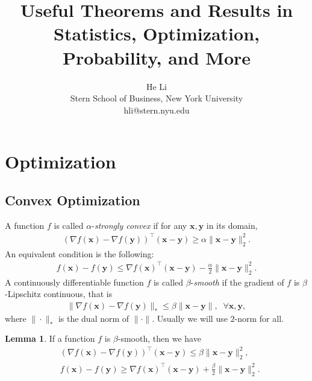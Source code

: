 \documentclass[twoside,11pt]{article}
\newcommand{\x}{\boldsymbol{x}}
\newcommand{\y}{\boldsymbol{y}}
\newcommand{\0}{\boldsymbol{0}}
\theoremstyle{definition}
\newtheorem{lemma}[theorem]{Lemma}
\begin{document}
\title{Useful Theorems and Results in Statistics, Optimization, Probability, and More}

\author{\name He Li \\
       \addr Stern School of Business, New York University \\
       hli@stern.nyu.edu
}

\maketitle

\section{Optimization}

\subsection{Convex Optimization}

A function $f$ is called $\alpha$-\emph{strongly convex} if for any $\x, \y$ in its domain,
\begin{align}
\label{eq:convex-1}
\left(\nabla f(\x) - \nabla f(\y) \right)^\top (\x - \y) \geq \alpha \| \x - \y \|_2^2.
\end{align}
An equivalent condition is the following:
\begin{align}
\label{eq:convex-2}
f(\x) - f(\y) \leq \nabla f(\x)^\top (\x - \y) - \frac{\alpha}{2} \| \x - \y \|_2^2.
\end{align}
A continuously differentiable function $f$ is called $\beta$-\emph{smooth} if the gradient of $f$ is $\beta$-Lipschitz continuous, that is
\begin{align}
\label{eq:smooth-1}
\| \nabla f(\x) - \nabla f(\y) \|_* \leq \beta \| \x - \y \|, \; \; \forall \x, \y,
\end{align}
where $\| \cdot \|_*$ is the dual norm of $\| \cdot \|$. Usually we will use $2$-norm for all.

\begin{lemma} If a function $f$ is $\beta$-smooth, then we have
\begin{align}
\label{eq:smooth-2}
&\left(\nabla f(\x) - \nabla f(\y) \right)^\top (\x - \y) \leq \beta \| \x - \y \|_2^2, \\
\label{eq:smooth-3}
&f(\x) - f(\y) \geq \nabla f(\x)^\top (\x - \y) + \frac{\beta}{2} \| \x - \y \|_2^2.
\end{align}
\end{lemma}
\end{document}
